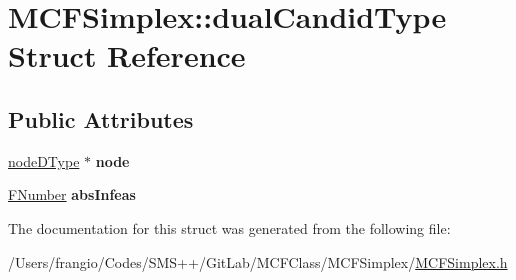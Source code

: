 \hypertarget{struct_m_c_f_simplex_1_1dual_candid_type}{}\section{M\+C\+F\+Simplex\+:\+:dual\+Candid\+Type Struct Reference}
\label{struct_m_c_f_simplex_1_1dual_candid_type}
\subsection*{Public Attributes}
\begin{DoxyCompactItemize}
\item 
\mbox{\label{struct_m_c_f_simplex_1_1dual_candid_type_a0dcb22a268df51ec4063ac5adb6bef3a}} 
\mbox{\hyperlink{struct_m_c_f_simplex_1_1node_d_type}{node\+D\+Type}} $\ast$ {\bfseries node}
\item 
\mbox{\label{struct_m_c_f_simplex_1_1dual_candid_type_a69a8881b00d74188ab30b84e3b201e8e}} 
\mbox{\hyperlink{class_m_c_f_class_aeea3e5951d222b2a8e57de1b4246a909}{F\+Number}} {\bfseries abs\+Infeas}
\end{DoxyCompactItemize}


The documentation for this struct was generated from the following file\+:\begin{DoxyCompactItemize}
\item 
/\+Users/frangio/\+Codes/\+S\+M\+S++/\+Git\+Lab/\+M\+C\+F\+Class/\+M\+C\+F\+Simplex/\mbox{\hyperlink{_m_c_f_simplex_8h}{M\+C\+F\+Simplex.\+h}}\end{DoxyCompactItemize}
